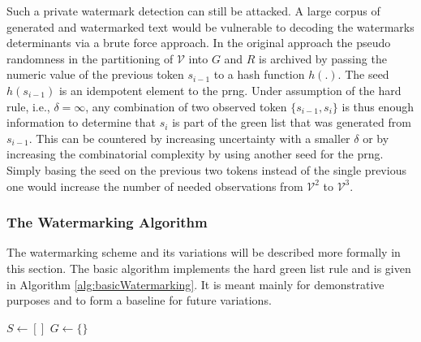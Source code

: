 	Such a private watermark detection can still be attacked.
	A large corpus of generated and watermarked text would be vulnerable to decoding the watermarks determinants via a brute force approach.
	In the original approach the pseudo randomness in the partitioning of $\mathcal{V}$ into $G$ and $R$ is archived by passing the numeric value of the previous token $s_{i-1}$ to a hash function $h(.)$.
	The seed $h(s_{i-1})$ is an idempotent element to the \ac{prng}.
	Under assumption of the hard rule, i.e., $\delta = \infty$, any combination of two observed token $\{s_{i-1}, s_i\}$ is thus enough information to determine that $s_i$ is part of the green list that was generated from $s_{i-1}$.
	This can be countered by increasing uncertainty with a smaller $\delta$ or by increasing the combinatorial complexity by using another seed for the \ac{prng}. 
	Simply basing the seed on the previous two tokens instead of the single previous one would increase the number of needed observations from $\mathcal{V}^2$ to $\mathcal{V}^3$. 
	
	\subsubsection{The Watermarking Algorithm}
	\label{sec:watermarkingAlgo}
	The watermarking scheme and its variations will be described more formally in this section.
	The basic algorithm implements the hard green list rule and is given in Algorithm \ref{alg:basicWatermarking}.
	It is meant mainly for demonstrative purposes and to form a baseline for future variations.

	\begin{algorithm}
        \caption{Basic Watermarking Algorithm\label{alg:basicWatermarking}}
        \DontPrintSemicolon
		\SetAlgoLined
        $S \gets []$ 	
		$G \gets \{\}$	
    \end{algorithm}

